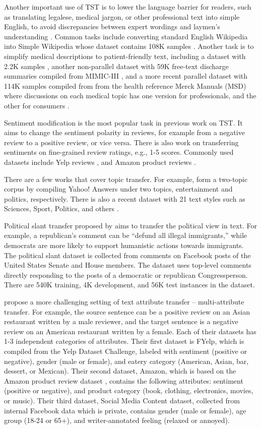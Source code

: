 Another important use of TST is to lower the language barrier for readers, such as translating
legalese, medical jargon, or other professional text into simple English, to avoid discrepancies between expert wordings and laymen's understanding . Common tasks include converting standard English Wikipedia into Simple Wikipedia whose dataset contains 108K samples . Another task is to simplify medical descriptions to patient-friendly text, including a dataset with 2.2K samples , another non-parallel dataset with 59K free-text discharge summaries compiled from MIMIC-III , and a more recent parallel dataset with 114K samples compiled from from the health reference Merck Manuals (MSD) where discussions on each medical topic has one version for professionals, and the other for consumers .

Sentiment modification is the most popular task in previous work on TST. It aims to change the sentiment polarity in reviews, for example from a negative review to a positive review, or vice versa. There is also work on  transferring sentiments on fine-grained review ratings, e.g., 1-5 scores. Commonly used datasets include Yelp reviews , and Amazon product reviews .

There are a few works that cover topic transfer. For example,  form a two-topic corpus by compiling Yahoo! Answers under two topics, entertainment and politics, respectively. There is also a recent dataset with 21 text styles such as Sciences, Sport, Politics, and others .

Political slant transfer proposed by  aims to transfer the political view in text. For example, a republican's comment can be ``defund all illegal immigrants,'' while democrats are more likely to support humanistic actions towards immigrants. The political slant dataset  is collected from comments on Facebook posts of the United States Senate and House members. The dataset uses top-level comments directly responding to the posts of a democratic or republican Congressperson. There are 540K training, 4K development, and 56K test instances in the dataset.

 propose a more challenging setting of text attribute transfer -- multi-attribute transfer. For example, the source sentence can be a positive review on an Asian restaurant written by a male reviewer, and the target sentence is a negative review on an American restaurant written by a female.
Each of their datasets has 1-3 independent categories of attributes. Their first dataset is FYelp, which is compiled from the Yelp Dataset Challenge, labeled with sentiment (positive or negative),  gender (male or female), and eatery category (American, Asian, bar, dessert, or Mexican).
Their second dataset, Amazon, which is based on the Amazon product review dataset , contains the following attributes: sentiment (positive or negative), and product category (book, clothing, electronics, movies, or music). Their third dataset, Social Media Content dataset, collected from internal Facebook data which is private, contains gender (male or female), age group (18-24 or 65+), and writer-annotated feeling (relaxed or annoyed).

